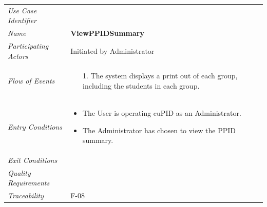 \documentclass[12pt,letterpaper]{article}
\begin{document}
\begin{center}
	\begin{tabu} to 
		\toprule
		Use Case Identifier & \viewppidsummary{} \\
		Name & {\bf ViewPPIDSummary} \\
		Participating Actors & Initiated by Administrator \\
		Flow of Events & 
		\begin{minipage}[t]{\linewidth}
		    \begin{enumerate}
		        \item[1.] The system displays a print out of each group, including the students in each group.
			\end{enumerate}
	    \end{minipage} \\

		Entry Conditions &
		\begin{minipage}[t]{\linewidth}
			\begin{itemize}
			    \item The User is operating cuPID as an Administrator.
			    \item The Administrator has chosen to view the PPID summary.
	        \end{itemize}
	    \end{minipage} \\

		Exit Conditions & \\

		Quality Requirements & \\

		Traceability & F-08 \\
		\toprule
	\end{tabu}
\end{center}
\end{document}
